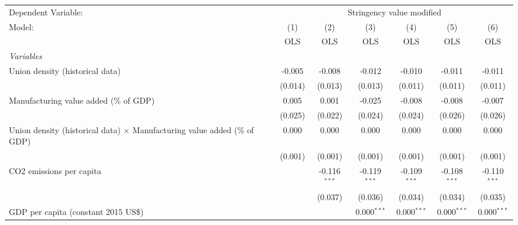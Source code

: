 
\begingroup
\centering
\begin{tabular}{lcccccc}
   \toprule
   Dependent Variable: & \multicolumn{6}{c}{Stringency value modified}\\
   Model:                                                                           & (1)     & (2)            & (3)            & (4)            & (5)            & (6)\\  
                                                                                    &  OLS    & OLS            & OLS            & OLS            & OLS            & OLS\\  
   \midrule
   \emph{Variables}\\
   Union density (historical data)                                                  & -0.005  & -0.008         & -0.012         & -0.010         & -0.011         & -0.011\\   
                                                                                    & (0.014) & (0.013)        & (0.013)        & (0.011)        & (0.011)        & (0.011)\\   
   Manufacturing value added (\% of GDP)                                            & 0.005   & 0.001          & -0.025         & -0.008         & -0.008         & -0.007\\   
                                                                                    & (0.025) & (0.022)        & (0.024)        & (0.024)        & (0.026)        & (0.026)\\   
   Union density (historical data) $\times$ Manufacturing value added (\% of GDP)   & 0.000   & 0.000          & 0.000          & 0.000          & 0.000          & 0.000\\   
                                                                                    & (0.001) & (0.001)        & (0.001)        & (0.001)        & (0.001)        & (0.001)\\   
   CO2 emissions per capita                                                         &         & -0.116$^{***}$ & -0.119$^{***}$ & -0.109$^{***}$ & -0.108$^{***}$ & -0.110$^{***}$\\   
                                                                                    &         & (0.037)        & (0.036)        & (0.034)        & (0.034)        & (0.035)\\   
   GDP per capita (constant 2015 US\$)                                              &         &                & 0.000$^{***}$  & 0.000$^{***}$  & 0.000$^{***}$  & 0.000$^{***}$\\   

\end{tabular}
